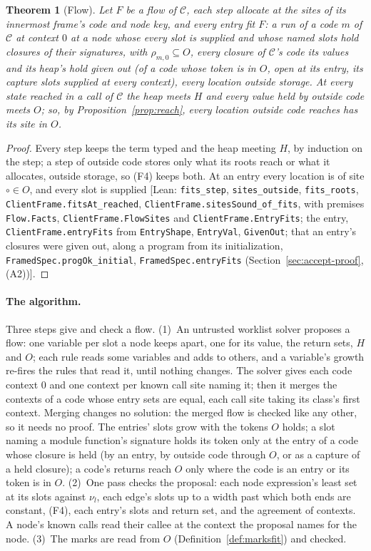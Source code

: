 \documentclass[10pt,a4paper]{article}
\newtheorem{theorem}{Theorem}
\theoremstyle{definition}
\theoremstyle{remark}
\newcommand{\lean}[1]{\texttt{\small #1}}
\newcommand{\status}[1]{\textsf{\small[#1]}}
\newcommand{\cC}{\mathcal{C}}
\begin{document}
\begin{theorem}[Flow]\label{thm:flow}
Let $F$ be a flow of $\cC$, each step allocate at the sites of its
innermost frame's code and node key, and every entry fit $F$: a run of a code $m$ of
$\cC$ at context $0$ at a node whose every slot is supplied and whose
named slots hold closures of their signatures, with $\rho_{m,0}\subseteq
O$, every closure of $\cC$'s code its values and its heap's hold
\emph{given out} (of a code whose token is in $O$, open at its entry, its
capture slots supplied at every context), every location outside
storage. At every state reached in a call of $\cC$ the heap meets $H$ and
every value held by outside code meets $O$; so, by
Proposition~\ref{prop:reach}, every location outside code reaches has its
site in $O$.
\end{theorem}
\begin{proof}\sloppy
Every step keeps the term typed and the heap meeting $H$, by induction on
the step; a step of outside code stores only what its roots reach or what
it allocates, outside storage, so (F4) keeps both. At an entry every
location is of site $\circ\in O$, and every slot is supplied
\status{Lean: \lean{fits\_step}, \lean{sites\_outside}, \lean{fits\_roots}, \lean{ClientFrame.fitsAt\_reached}, \lean{ClientFrame.sitesSound\_of\_fits}, with premises \lean{Flow.Facts}, \lean{ClientFrame.FlowSites} and \lean{ClientFrame.EntryFits}; the entry, \lean{ClientFrame.entryFits} from \lean{EntryShape}, \lean{EntryVal}, \lean{GivenOut}; that an entry's closures were given out, along a program from its initialization, \lean{FramedSpec.progOk\_initial}, \lean{FramedSpec.entryFits} (Section~\ref{sec:accept-proof}, (A2))}.
\end{proof}

\paragraph{The algorithm.} Three steps give and check a flow.
(1)~An untrusted worklist solver proposes a flow: one variable per slot a
node keeps apart, one for its value, the return sets, $H$ and $O$; each
rule reads some variables and adds to others, and a variable's growth
re-fires the rules that read it, until nothing changes. The solver gives
each code context $0$ and one context per known call site naming it;
then it merges the contexts of a code whose entry sets are equal, each
call site taking its class's first context. Merging changes no solution:
the merged flow is checked like any other, so it needs no proof. The
entries' slots grow with the tokens $O$ holds; a slot naming a module
function's signature holds its token only at the entry of a code whose
closure is held (by an entry, by outside code through $O$, or as a
capture of a held closure); a code's returns reach $O$ only where the code
is an entry or its token is in $O$.
(2)~One pass checks the proposal: each node expression's least set at its
slots against $\nu_l$, each edge's slots up to a width past which both ends
are constant, (F4), each entry's slots and return set, and the agreement
of contexts. A node's known calls read their callee at the context the
proposal names for the node.
(3)~The marks are read from $O$ (Definition~\ref{def:marksfit}) and
checked.
\end{document}

